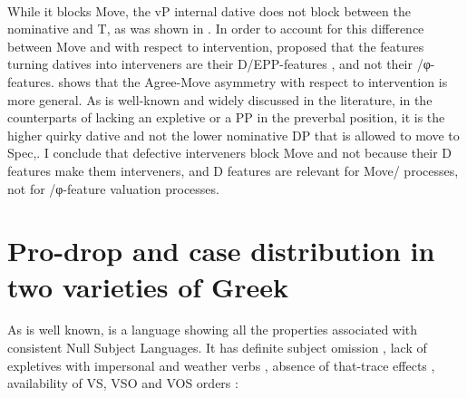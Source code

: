 \documentclass[output=paper]{LSP/langsci}
\begin{document}
\ea\label{ex:anagnost:7}
\z
\z

\ea\label{ex:anagnost:8}
\\
\z
\z

While it blocks Move, the vP internal dative does not block  between the nominative and T, as was shown in . In order to account for this difference between Move and  with respect to intervention, \citet[222]{Anagnostopoulou2003} proposed that the features turning  datives into interveners
are their D/EPP-features%
, and not their /φ-features.  shows that the Agree-Move asymmetry with respect to intervention is more general. As is well-known and widely discussed in the literature, in the counterparts of  lacking an expletive or a PP in the preverbal position, it is the higher quirky dative and not the lower nominative DP that is allowed to move to Spec,. I conclude that defective interveners block Move and not  because their D features make them interveners, and D features are relevant for Move/ processes, not for /φ-feature valuation processes. 


\section{Pro-drop and case distribution in two varieties of Greek}
As is well known,  is a language showing all the properties associated with consistent Null Subject Languages. It has definite subject omission , lack of expletives with impersonal and weather verbs , absence of that-trace effects , availability of VS, VSO and VOS orders : 
\end{document}
